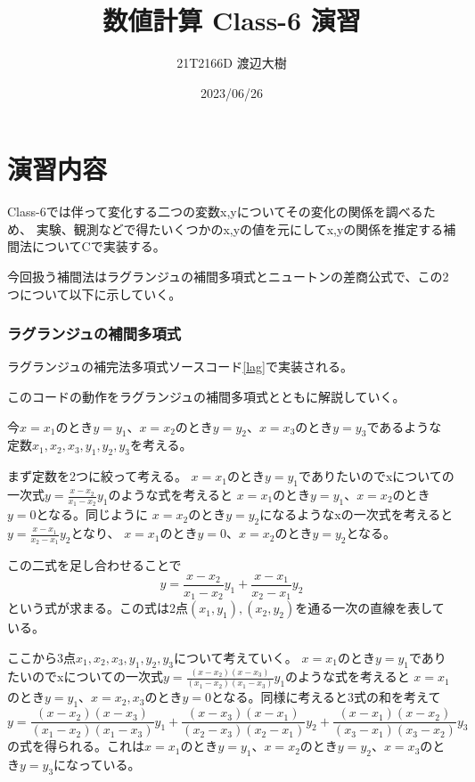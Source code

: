 \documentclass[a4paper,11pt,dvipdfmx]{jsarticle}
\begin{document}
\title{数値計算 Class-6 演習}
\author{21T2166D 渡辺大樹}
\date{2023/06/26}
\maketitle

\section{演習内容}
Class-6では伴って変化する二つの変数x,yについてその変化の関係を調べるため、
実験、観測などで得たいくつかのx,yの値を元にしてx,yの関係を推定する補間法についてCで実装する。

今回扱う補間法はラグランジュの補間多項式とニュートンの差商公式で、この2つについて以下に示していく。
\subsubsection{ラグランジュの補間多項式}
ラグランジュの補完法多項式ソースコード\ref{lag}で実装される。


このコードの動作をラグランジュの補間多項式とともに解説していく。

今$x=x_1$のとき$y=y_1$、$x=x_2$のとき$y=y_2$、$x=x_3$のとき$y=y_3$であるような
定数$x_1,x_2,x_3,y_1,y_2,y_3$を考える。

まず定数を2つに絞って考える。
$x=x_1$のとき$y=y_1$でありたいのでxについての一次式$y=\frac{x-x_2}{x_1-x_2}y_1$のような式を考えると
$x=x_1$のとき$y=y_1$、$x=x_2$のとき$y=0$となる。同じように
$x=x_2$のとき$y=y_2$になるようなxの一次式を考えると$y=\frac{x-x_1}{x_2-x_1}y_2$となり、
$x=x_1$のとき$y=0$、$x=x_2$のとき$y=y_2$となる。

この二式を足し合わせることで
\begin{equation*}
    y=\frac{x-x_2}{x_1-x_2}y_1 + \frac{x-x_1}{x_2-x_1}y_2
\end{equation*}
という式が求まる。この式は2点$(x_1,y_1),(x_2,y_2)$を通る一次の直線を表している。

ここから3点$x_1,x_2,x_3,y_1,y_2,y_3$について考えていく。
$x=x_1$のとき$y=y_1$でありたいのでxについての一次式$y=\frac{(x-x_2)(x-x_3)}{(x_1-x_2)(x_1-x_3)}y_1$のような式を考えると
$x=x_1$のとき$y=y_1$、$x=x_2,x_3$のとき$y=0$となる。同様に考えると3式の和を考えて
\begin{equation*}
    y=\frac{(x-x_2)(x-x_3)}{(x_1-x_2)(x_1-x_3)}y_1 + \frac{(x-x_3)(x-x_1)}{(x_2-x_3)(x_2-x_1)}y_2 + \frac{(x-x_1)(x-x_2)}{(x_3-x_1)(x_3-x_2)}y_3
\end{equation*}
の式を得られる。これは$x=x_1$のとき$y=y_1$、$x=x_2$のとき$y=y_2$、$x=x_3$のとき$y=y_3$になっている。
\end{document}
